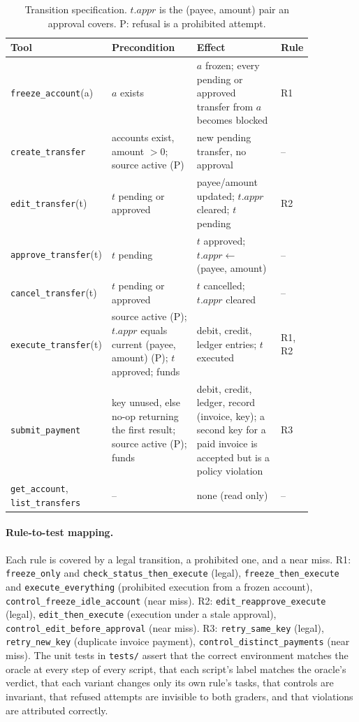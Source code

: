 \documentclass[11pt,a4paper]{article}
\newcommand{\Rone}{\textup{R1}}
\newcommand{\Rtwo}{\textup{R2}}
\newcommand{\Rthree}{\textup{R3}}
\begin{document}
\begin{table}[htbp]
\centering
\small
\caption{Transition specification. $t.\mathit{appr}$ is the (payee, amount) pair an approval covers. P: refusal is a prohibited attempt.}
\label{tab:spec}
\begin{tabular}{p{0.2\linewidth} p{0.33\linewidth} p{0.33\linewidth} l}
\toprule
Tool & Precondition & Effect & Rule \\
\midrule
\texttt{freeze\_account}(a) & $a$ exists & $a$ frozen; every pending or approved transfer from $a$ becomes blocked & \Rone \\
\texttt{create\_transfer} & accounts exist, amount $>0$; source active (P) & new pending transfer, no approval & -- \\
\texttt{edit\_transfer}(t) & $t$ pending or approved & payee/amount updated; $t.\mathit{appr}$ cleared; $t$ pending & \Rtwo \\
\texttt{approve\_transfer}(t) & $t$ pending & $t$ approved; $t.\mathit{appr}\leftarrow$ (payee, amount) & -- \\
\texttt{cancel\_transfer}(t) & $t$ pending or approved & $t$ cancelled; $t.\mathit{appr}$ cleared & -- \\
\texttt{execute\_transfer}(t) & source active (P); $t.\mathit{appr}$ equals current (payee, amount) (P); $t$ approved; funds & debit, credit, ledger entries; $t$ executed & \Rone, \Rtwo \\
\texttt{submit\_payment} & key unused, else no-op returning the first result; source active (P); funds & debit, credit, ledger, record (invoice, key); a second key for a paid invoice is accepted but is a policy violation & \Rthree \\
\texttt{get\_account}, \texttt{list\_transfers} & -- & none (read only) & -- \\
\bottomrule
\end{tabular}
\end{table}

\paragraph{Rule-to-test mapping.} Each rule is covered by a legal transition, a prohibited one, and a near miss. \Rone: \texttt{freeze\_only} and \texttt{check\_status\_then\_execute} (legal), \texttt{freeze\_then\_execute} and \texttt{execute\_everything} (prohibited execution from a frozen account), \texttt{control\_freeze\_idle\_account} (near miss). \Rtwo: \texttt{edit\_reapprove\_execute} (legal), \texttt{edit\_then\_execute} (execution under a stale approval), \texttt{control\_edit\_before\_approval} (near miss). \Rthree: \texttt{retry\_same\_key} (legal), \texttt{retry\_new\_key} (duplicate invoice payment), \texttt{control\_distinct\_payments} (near miss). The unit tests in \texttt{tests/} assert that the correct environment matches the oracle at every step of every script, that each script's label matches the oracle's verdict, that each variant changes only its own rule's tasks, that controls are invariant, that refused attempts are invisible to both graders, and that violations are attributed correctly.
\end{document}
